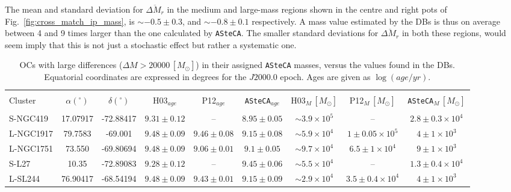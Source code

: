 \documentclass[a4paper,fleqn,usenatbib]{mnras}
\begin{document}
The mean and standard deviation for $\overline{\Delta M_r}$ in the medium and
large-mass regions shown in the centre and right pots of
Fig.~\ref{fig:cross_match_ip_mass}, is ${\sim-}0.5\pm0.3$,
and ${\sim-}0.8\pm0.1$ respectively.
A mass value estimated by the DBs is thus on average between 4 and 9 times
larger than the one calculated by \texttt{ASteCA}.
The smaller standard deviations for $\overline{\Delta M_r}$ in both these
regions, would seem imply that this is not just a stochastic effect but rather a
systematic one.

%
\begin{table*}
\centering
\caption{OCs with large differences ($\Delta M>20000\,[M_{\odot}]$) in their
assigned \texttt{ASteCA} masses, versus the values found in the DBs.
Equatorial coordinates are expressed in degrees for the $J2000.0$ epoch.
Ages are given as $\log(age/yr)$.}
\label{tab:integ_phot_masses}
\begin{tabular}{lcccccccc}
\hline
\hline\\[-1.85ex]
Cluster & $\alpha(^\circ)$ & $\delta(^\circ)$ & H03$_{age}$ &
P12$_{age}$ & \texttt{ASteCA}$_{age}$ &
H03$_{M}\,[M_{\odot}]$ &
P12$_{M}\,[M_{\odot}]$ & \texttt{ASteCA}$_{M}\,[M_{\odot}]$\\
\hline\\[-1.85ex]
%
S-NGC419 & 17.07917 & -72.88417 & $9.31\pm0.12$ & -- & $8.95\pm0.05$ &
$\sim3.9{\times}10^{5}$ & -- & $2.8\pm0.3{\times}10^{4}$\\
%
L-NGC1917 & 79.7583 & -69.001 & $9.48\pm0.09$ & $9.46\pm0.08$ & $9.15\pm0.08$ &
$\sim5.9{\times}10^{4}$ & $1\pm0.05{\times}10^{5}$ & $4\pm1{\times}10^{3}$\\
%
L-NGC1751 & 73.550 & -69.80694 & $9.48\pm0.09$ & $9.06\pm0.01$ & $9.1\pm0.05$ &
$\sim9.7{\times}10^{4}$ & $6.5\pm1{\times}10^{4}$ & $9\pm1{\times}10^{3}$\\
%
S-L27 & 10.35 & -72.89083 & $9.28\pm0.12$ & -- & $9.45\pm0.06$ &
$\sim5.5{\times}10^{4}$ & -- & $1.3\pm0.4{\times}10^{4}$\\
%
L-SL244 & 76.90417 & -68.54194 & $9.48\pm0.09$ & $9.43\pm0.01$ & $9.15\pm0.09$ &
$\sim2.9{\times}10^{4}$ & $3.5\pm0.4{\times}10^{4}$ & $4\pm1{\times}10^{3}$\\
\end{tabular}
\end{table*}
\end{document}
